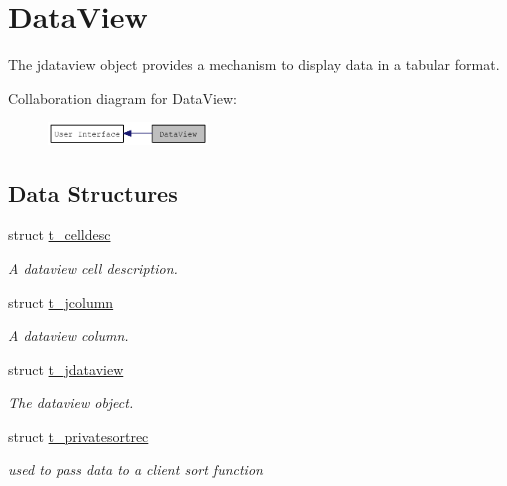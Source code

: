 \hypertarget{group__jdataview}{
\section{DataView}
\label{group__jdataview}
}


The jdataview object provides a mechanism to display data in a tabular format.  


Collaboration diagram for DataView:\nopagebreak
\begin{figure}[H]
\begin{center}
\leavevmode
\includegraphics[width=120pt]{group__jdataview}
\end{center}
\end{figure}
\subsection*{Data Structures}
\begin{DoxyCompactItemize}
\item 
struct \hyperlink{structt__celldesc}{t\_\-celldesc}
\begin{DoxyCompactList}\small\item\em A dataview cell description. \item\end{DoxyCompactList}\item 
struct \hyperlink{structt__jcolumn}{t\_\-jcolumn}
\begin{DoxyCompactList}\small\item\em A dataview column. \item\end{DoxyCompactList}\item 
struct \hyperlink{structt__jdataview}{t\_\-jdataview}
\begin{DoxyCompactList}\small\item\em The dataview object. \item\end{DoxyCompactList}\item 
struct \hyperlink{structt__privatesortrec}{t\_\-privatesortrec}
\begin{DoxyCompactList}\small\item\em used to pass data to a client sort function \item\end{DoxyCompactList}\end{DoxyCompactItemize}
